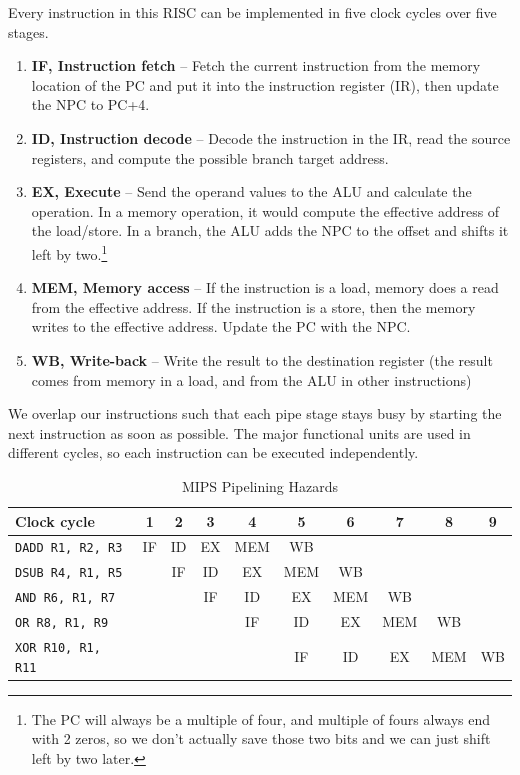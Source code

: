 \documentclass{article}
\begin{document}
Every instruction in this RISC can be implemented in five clock cycles over five stages.

\begin{enumerate}
\item \textbf{IF, Instruction fetch} -- Fetch the current instruction from the memory location of the PC and put it into the instruction register (IR), then update the NPC to PC+4. 

\item \textbf{ID, Instruction decode} -- Decode the instruction in the IR, read the source registers, and compute the possible branch target address.

\item \textbf{EX, Execute} -- Send the operand values to the ALU and calculate the operation. In a memory operation, it would compute the effective address of the load/store. In a branch, the ALU adds the NPC to the offset and shifts it left by two.\footnote{The PC will always be a multiple of four, and multiple of fours always end with 2 zeros, so we don't actually save those two bits and we can just shift left by two later.}

\item \textbf{MEM, Memory access} -- If the instruction is a load, memory does a read from the effective address. If the instruction is a store, then the memory writes to the effective address. Update the PC with the NPC.

\item \textbf{WB, Write-back} -- Write the result to the destination register (the result comes from memory in a load, and from the ALU in other instructions)

\end{enumerate}

We overlap our instructions such that each pipe stage stays busy by starting the next instruction as soon as possible. The major functional units are used in different cycles, so each instruction can be executed independently.

\begin{table}[H]
\small
\centering
\caption{MIPS Pipelining Hazards}
\begin{tabular}{lccccccccc}
\toprule
\textbf{Clock cycle} 		& 1 	& 2 	& 3 	& 4 	& 5 	& 6 	& 7 	& 8 	& 9   	\\ 
\midrule
\texttt{DADD R1, R2, R3} 	& IF 	& ID 	& EX 	& MEM 	& WB  	& 		& 		& 		&  		\\
\texttt{DSUB R4, R1, R5} 	&		& IF 	& ID 	& EX 	& MEM 	& WB  	& 		& 		& 		\\
\texttt{AND  R6, R1, R7} 	&		&		& IF 	& ID 	& EX 	& MEM 	& WB  	& 		& 	  	\\
\texttt{OR   R8, R1, R9} 	&		&		&		& IF 	& ID 	& EX 	& MEM 	& WB  	&  	  	\\
\texttt{XOR  R10, R1, R11} 	&		&		&		&		& IF 	& ID 	& EX 	& MEM 	& WB  	\\
\bottomrule
\end{tabular}
\end{table}
\end{document}
